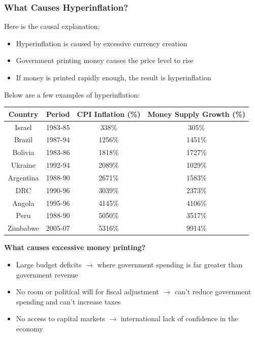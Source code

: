 \documentclass[12pt, letterpaper]{article}
\begin{document}
\subsubsection{What Causes Hyperinflation?}
Here is the causal explanation:
\begin{itemize}
	\item Hyperinflation is caused by excessive currency creation
	\item Government printing money causes the price level to rise
	\item If money is printed rapidly enough, the result is hyperinflation
\end{itemize}
Below are a few examples of hyperinflation:
\begin{center}
\begin{tabular}{||c|c|c|c||}

\hline
Country & Period & CPI Inflation (\%) & Money Supply Growth (\%)\\
\hline
Israel & 1983-85 & 338\% & 305\%\\
\hline
Brazil & 1987-94 & 1256\% & 1451\%\\
\hline
Bolivia & 1983-86 & 1818\% & 1727\%\\
\hline
Ukraine & 1992-94 & 2089\% & 1029\%\\
\hline
Argentina & 1988-90 & 2671\% & 1583\%\\
\hline
DRC & 1990-96 & 3039\% & 2373\%\\
\hline
Angola & 1995-96 & 4145\% & 4106\%\\
\hline
Peru & 1988-90 & 5050\% & 3517\%\\
\hline
Zimbabwe & 2005-07 & 5316\% & 9914\%\\
\hline

\end{tabular}
\end{center}
\textbf{What causes excessive money printing?}
\begin{itemize}
	\item Large budget deficits $\rightarrow$ where government spending is far greater than government revenue
	\item No room or political will for fiscal adjustment $\rightarrow$ can't reduce government spending and can't increase taxes
	\item No access to capital markets $\rightarrow$ international lack of confidence in the economy
\end{itemize}
\end{document}
